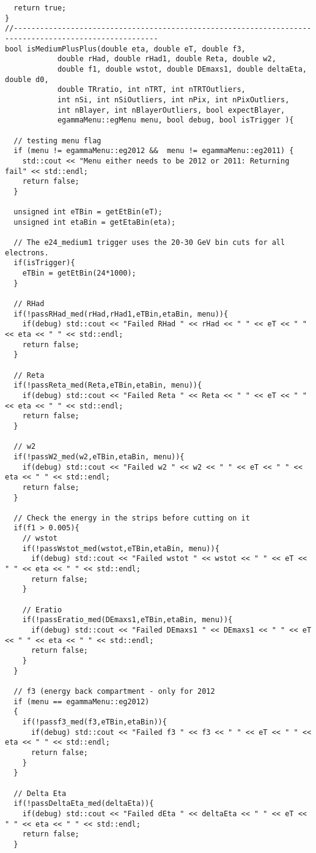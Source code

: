 \begin{lstlisting}
  return true;
}
//-------------------------------------------------------------------------------------------------------
bool isMediumPlusPlus(double eta, double eT, double f3, 
			double rHad, double rHad1, double Reta, double w2, 
			double f1, double wstot, double DEmaxs1, double deltaEta, double d0,
			double TRratio, int nTRT, int nTRTOutliers,
			int nSi, int nSiOutliers, int nPix, int nPixOutliers, 
			int nBlayer, int nBlayerOutliers, bool expectBlayer, 
			egammaMenu::egMenu menu, bool debug, bool isTrigger ){
		      
  // testing menu flag
  if (menu != egammaMenu::eg2012 &&  menu != egammaMenu::eg2011) {
    std::cout << "Menu either needs to be 2012 or 2011: Returning fail" << std::endl;
    return false; 
  }

  unsigned int eTBin = getEtBin(eT);
  unsigned int etaBin = getEtaBin(eta);
  
  // The e24_medium1 trigger uses the 20-30 GeV bin cuts for all electrons. 
  if(isTrigger){
    eTBin = getEtBin(24*1000);
  }

  // RHad
  if(!passRHad_med(rHad,rHad1,eTBin,etaBin, menu)){
    if(debug) std::cout << "Failed RHad " << rHad << " " << eT << " " << eta << " " << std::endl;
    return false;
  }

  // Reta 
  if(!passReta_med(Reta,eTBin,etaBin, menu)){
    if(debug) std::cout << "Failed Reta " << Reta << " " << eT << " " << eta << " " << std::endl;
    return false;
  }

  // w2
  if(!passW2_med(w2,eTBin,etaBin, menu)){
    if(debug) std::cout << "Failed w2 " << w2 << " " << eT << " " << eta << " " << std::endl;
    return false;
  }

  // Check the energy in the strips before cutting on it
  if(f1 > 0.005){
    // wstot
    if(!passWstot_med(wstot,eTBin,etaBin, menu)){
      if(debug) std::cout << "Failed wstot " << wstot << " " << eT << " " << eta << " " << std::endl;
      return false;
    }

    // Eratio
    if(!passEratio_med(DEmaxs1,eTBin,etaBin, menu)){
      if(debug) std::cout << "Failed DEmaxs1 " << DEmaxs1 << " " << eT << " " << eta << " " << std::endl;
      return false;
    }
  }
 
  // f3 (energy back compartment - only for 2012
  if (menu == egammaMenu::eg2012)
  {
    if(!passf3_med(f3,eTBin,etaBin)){
      if(debug) std::cout << "Failed f3 " << f3 << " " << eT << " " << eta << " " << std::endl;
      return false;
    }
  }

  // Delta Eta
  if(!passDeltaEta_med(deltaEta)){
    if(debug) std::cout << "Failed dEta " << deltaEta << " " << eT << " " << eta << " " << std::endl;
    return false;
  }


\end{lstlisting}

